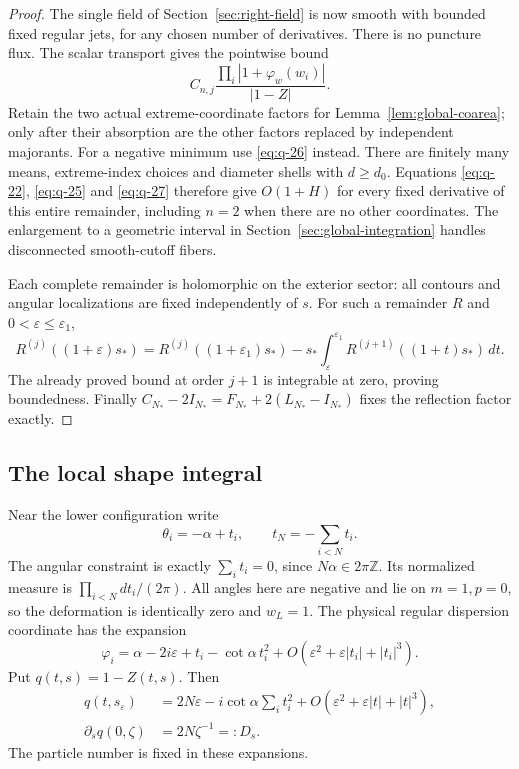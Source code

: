 \documentclass[11pt]{article}
\numberwithin{equation}{section}
\theoremstyle{remark}\newtheorem{remark}[theorem]{Remark}
\begin{document}
\begin{proof}
The single field of Section~\ref{sec:right-field} is now
smooth with bounded fixed regular jets, for any chosen
number of derivatives. There is no puncture flux. The
scalar transport gives the pointwise bound
\[
 C_{n,j}\frac{\prod_i|1+\varphi_w(w_i)|}{|1-Z|}.
\]
Retain the two actual extreme-coordinate factors for
Lemma~\ref{lem:global-coarea}; only after their absorption
are the other factors replaced by independent majorants.
For a negative minimum use \eqref{eq:q-26} instead.
There are finitely many means, extreme-index choices and
diameter shells with $d\ge d_0$. Equations
\eqref{eq:q-22}, \eqref{eq:q-25} and \eqref{eq:q-27}
therefore give $O(1+H)$ for every fixed derivative of this
entire remainder, including $n=2$ when there are no other
coordinates. The enlargement to a geometric interval
in Section~\ref{sec:global-integration} handles
disconnected smooth-cutoff fibers.

Each complete remainder is holomorphic on the exterior
sector: all contours and angular localizations are fixed
independently of $s$. For such a remainder $R$ and
$0<\varepsilon\le\varepsilon_1$,
\[
 R^{(j)}((1+\varepsilon)s_*)
 =R^{(j)}((1+\varepsilon_1)s_*)
   -s_*\int_\varepsilon^{\varepsilon_1}
              R^{(j+1)}((1+t)s_*)\,dt.
\]
The already proved bound at order $j+1$ is integrable at
zero, proving boundedness. Finally
$C_{N_*}-2I_{N_*}=F_{N_*}+2(L_{N_*}-I_{N_*})$ fixes the
reflection factor exactly.
\end{proof}

\subsection{The local shape integral}

Near the lower configuration write
\[
 \theta_i=-\alpha+t_i,\qquad
 t_N=-\sum_{i<N}t_i.
\]
The angular constraint is exactly $\sum_i t_i=0$, since
$N\alpha\in2\pi\mathbb Z$.  Its normalized measure is
$\prod_{i<N}dt_i/(2\pi)$.  All angles here are negative and lie on $m=1,p=0$,
so the deformation is identically zero and $w_L=1$.
The physical regular dispersion coordinate has the expansion
\[
 \varphi_i
  =\alpha-2i\varepsilon+t_i-\cot\alpha\,t_i^2
    +O(\varepsilon^2+\varepsilon|t_i|+|t_i|^3).
\]
Put $q(t,s)=1-Z(t,s)$.  Then
\begin{equation}\label{eq:single-q}
 \begin{split}
 q(t,s_\varepsilon)
  &=2N\varepsilon-i\cot\alpha\sum_i t_i^2
      +O(\varepsilon^2+\varepsilon|t|+|t|^3),\\
 \partial_s q(0,\zeta)&=2N\zeta^{-1}=:D_s.
 \end{split}
\end{equation}
The particle number is fixed in these expansions.
\end{document}
